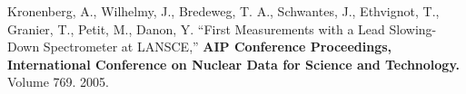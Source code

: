 \documentclass[margin,line]{resume}
\begin{document}
\begin{resume}
\begin{bibenum}
        Kronenberg, A., Wilhelmy, J., Bredeweg, T. A., Schwantes, J., Ethvignot, T.,
        Granier, T., Petit, M., Danon, Y.
        ``First Measurements with a Lead Slowing-Down Spectrometer at LANSCE,''
        \textbf{AIP Conference Proceedings, International Conference on Nuclear
        Data for Science and Technology.} Volume 769. 2005.
    \end{bibenum}

\end{resume}
\end{document}
